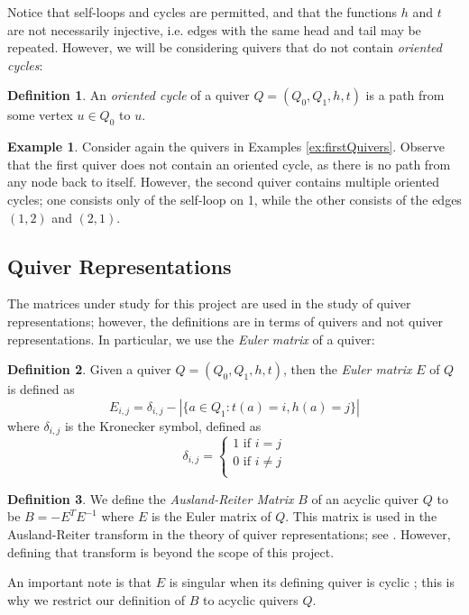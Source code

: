 \documentclass{amsart}
\theoremstyle{theorem}
\theoremstyle{theorem*}
\theoremstyle{definition}
\newtheorem{example}[theorem]{Example}
\newtheorem{definition}{Definition}
\begin{document}
Notice that self-loops and cycles are permitted, and that the functions $h$ and
$t$ are not necessarily injective, i.e. edges with the same head and tail may be
repeated. However, we will be considering quivers that do not contain
\textit{oriented cycles}:

\begin{definition} \cite{dw} An \textit{oriented cycle} of a quiver $Q = (Q_0,
        Q_1, h, t)$ is a path from some vertex $u \in Q_0$ to $u$.
\end{definition}

\begin{example}
    Consider again the quivers in Examples \ref{ex:firstQuivers}. Observe that the first quiver
    does not contain an oriented cycle, as there is no path from
    any node back to itself. However, the second quiver contains multiple
    oriented cycles; one consists only of the self-loop on 1, while the other
    consists of the edges $(1,2)$ and $(2,1)$.
\end{example}

\subsection{Quiver Representations}

The matrices under study for this project are used in the study of quiver
representations; however, the definitions are in terms of quivers and not
quiver representations. In particular, we use the \textit{Euler matrix}
of a quiver:

\begin{definition} \cite{dw} Given a quiver $Q = (Q_0, Q_1, h, t)$, then the
    \textit{Euler matrix} $E$ of $Q$ is defined as
    $$E_{i,j} = \delta_{i,j} - |\{a \in Q_1 : t(a) = i, h(a) = j \}|$$
    where $\delta_{i,j}$ is the Kronecker symbol, defined as
    $$\delta_{i,j} = \begin{cases} 1 \text{ if } i = j \\ 0 \text{ if } i \neq j
            \\\end{cases}$$
\end{definition}

\begin{definition} We define the \textit{Ausland-Reiter Matrix} $B$ of an acyclic
    quiver $Q$ to be $B = - E^T E^{-1}$ where $E$ is the Euler matrix of $Q$.
    This matrix is used in the Ausland-Reiter transform in the theory of quiver
    representations; see \cite{dw}. However, defining that transform is beyond
    the scope of this project.
    
    An important note is that $E$ is singular when its defining quiver is cyclic
    \cite{dp}; this is why we restrict our definition of $B$ to acyclic quivers
    $Q$. 
\end{definition}
\end{document}
